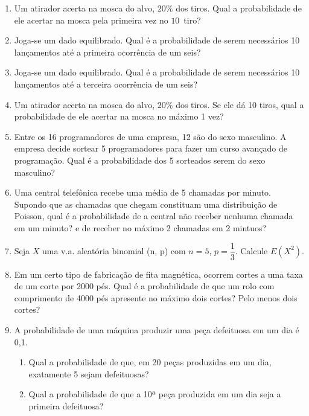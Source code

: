 \begin{enumerate}
\item Um atirador acerta na mosca do alvo, $20\%$ dos tiros. Qual a probabilidade de ele acertar na mosca pela primeira vez no $10$\textordmasculine\ tiro?


	\solv{}

\item Joga-se um dado equilibrado. Qual é a probabilidade de serem necessários 10 lançamentos até a primeira ocorrência de um seis?

	

\item Joga-se um dado equilibrado. Qual é a probabilidade de serem necessários 10 lançamentos até a terceira ocorrência de um seis?
	
\item Um atirador acerta na mosca do alvo, $20\%$ dos tiros. Se ele dá 10 tiros, qual a probabilidade de ele acertar na mosca no máximo 1 vez?

	
	
\item Entre os 16 programadores de uma empresa, 12 são do sexo masculino. A empresa decide sortear 5 programadores para fazer um curso avançado de programação. Qual é a probabilidade dos 5 sorteados serem do sexo masculino?

\item Uma central telefônica recebe uma média de 5 chamadas por minuto. Supondo que as chamadas que chegam constituam uma distribuição de Poisson, qual é a probabilidade de a central não receber nenhuma chamada em um minuto? e de receber no máximo 2 chamadas em 2 mintuos?

\item Seja $X$ uma v.a. aleatória binomial (n, p) com $n = 5$, $p=\dfrac{1}{3}$. Calcule $E(X^{2})$.

\item Em um certo tipo de fabricação de fita magnética, ocorrem cortes a uma taxa de um corte por 2000 pés. Qual é a probabilidade de que um rolo com comprimento de 4000 pés apresente no máximo dois cortes? Pelo menos dois cortes?

\setcounter{enumi}{9}
\item A probabilidade de uma máquina produzir uma peça defeituosa em um dia é 0,1.

	\begin{enumerate}[label=\alph*)]
		\item Qual a probabilidade de que, em 20 peças produzidas em um dia, exatamente 5 sejam defeituosas?
		\item Qual a probabilidade de que a 10ª peça produzida em um dia seja a primeira defeituosa?
	\end{enumerate}


\end{enumerate}
